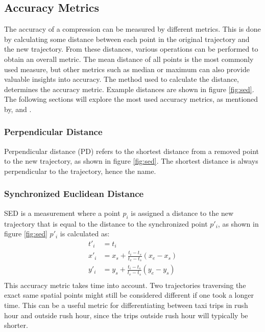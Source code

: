 \subsection{Accuracy Metrics}
The accuracy of a compression can be measured by different metrics. This is done by calculating some distance between each point in the original trajectory and the new trajectory. From these distances, various operations can be performed to obtain an overall metric. The mean distance of all points is the most commonly used measure, but other metrics such as median or maximum can also provide valuable insights into accuracy. The method used to calculate the distance, determines the accuracy metric. Example distances are shown in figure \ref{fig:sed}. The following sections will explore the most used accuracy metrics, as mentioned by, \textcite{TrajFramework} and \textcite{Sun2016}.

\subsubsection{Perpendicular Distance}
\label{subsec:PD}
Perpendicular distance (PD) refers to the shortest distance from a removed point to the new trajectory, as shown in figure \ref{fig:sed}. The shortest distance is always perpendicular to the trajectory, hence the name.

\subsubsection{Synchronized Euclidean Distance}
\label{subsub:SED}
SED is a measurement where a point $p_{i}$ is assigned a distance to the new trajectory that is equal to the distance to the synchronized point $p'_{i}$, as shown in figure \ref{fig:sed} $p'_{i}$ is calculated as:
\begin{equation}
    \begin{aligned}
        t'_{i} & = t_{i}                                                \\
        x'_{i} & = x_{s} + \frac{t_{i}-t_{s}}{t_{e}-t_{s}}(x_{e}-x_{s}) \\
        y'_{i} & = y_{s} + \frac{t_{i}-t_{s}}{t_{e}-t_{s}}(y_{e}-y_{s}) \\
    \end{aligned}
\end{equation}
This accuracy metric takes time into account. Two trajectories traversing the exact same spatial points might still be considered different if one took a longer time. This can be a useful metric for differentiating between taxi trips in rush hour and outside rush hour, since the trips outside rush hour will typically be shorter.

